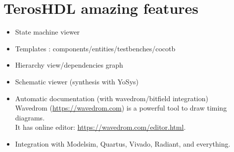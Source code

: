 \documentclass[aspectratio=169]{beamer}
\begin{document}
\section*{TerosHDL amazing features}
\begin{frame}{\secname}

  \begin{itemize}
    \item State machine viewer
    \item Templates : components/entities/testbenches/cocotb
    \item Hierarchy view/dependencies graph
    \item Schematic viewer (synthesis with YoSys)
    \item Automatic documentation (with wavedrom/bitfield integration) \\
      Wavedrom (\url{https://wavedrom.com}) is a powerful tool to draw timing diagrams.\\
      It has online editor: \url{https://wavedrom.com/editor.html}.
    \item Integration with Modelsim, Quartus, Vivado, Radiant, and everything.
  \end{itemize}
    
\end{frame}
\end{document}
